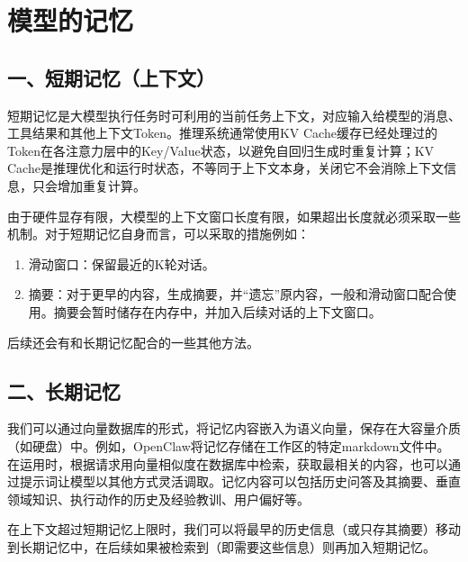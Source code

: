 \clearpage

\hypertarget{ux6a21ux578bux7684ux8bb0ux5fc6}{%
\section{模型的记忆}\label{ux6a21ux578bux7684ux8bb0ux5fc6}}

\hypertarget{ux4e00ux77edux671fux8bb0ux5fc6ux4e0aux4e0bux6587}{%
\subsection{一、短期记忆（上下文）}\label{ux4e00ux77edux671fux8bb0ux5fc6ux4e0aux4e0bux6587}}

短期记忆是大模型执行任务时可利用的当前任务上下文，对应输入给模型的消息、工具结果和其他上下文Token。推理系统通常使用KV Cache缓存已经处理过的Token在各注意力层中的Key/Value状态，以避免自回归生成时重复计算；KV Cache是推理优化和运行时状态，不等同于上下文本身，关闭它不会消除上下文信息，只会增加重复计算。

由于硬件显存有限，大模型的上下文窗口长度有限，如果超出长度就必须采取一些机制。对于短期记忆自身而言，可以采取的措施例如：

\begin{enumerate}
\def\labelenumi{\arabic{enumi}.}
\item
  滑动窗口：保留最近的K轮对话。
\item
  摘要：对于更早的内容，生成摘要，并``遗忘''原内容，一般和滑动窗口配合使用。摘要会暂时储存在内存中，并加入后续对话的上下文窗口。
\end{enumerate}

后续还会有和长期记忆配合的一些其他方法。

\hypertarget{ux4e8cux957fux671fux8bb0ux5fc6}{%
\subsection{二、长期记忆}\label{ux4e8cux957fux671fux8bb0ux5fc6}}

我们可以通过向量数据库的形式，将记忆内容嵌入为语义向量，保存在大容量介质（如硬盘）中。例如，OpenClaw将记忆存储在工作区的特定markdown文件中。在运用时，根据请求用向量相似度在数据库中检索，获取最相关的内容，也可以通过提示词让模型以其他方式灵活调取。记忆内容可以包括历史问答及其摘要、垂直领域知识、执行动作的历史及经验教训、用户偏好等。

在上下文超过短期记忆上限时，我们可以将最早的历史信息（或只存其摘要）移动到长期记忆中，在后续如果被检索到（即需要这些信息）则再加入短期记忆。

